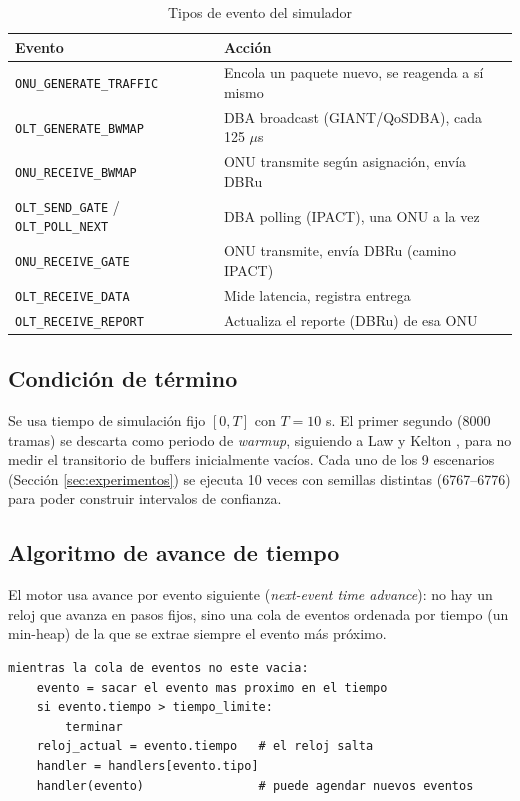 \documentclass[conference]{IEEEtran}
\begin{document}
\begin{table}[h]
\centering
\caption{Tipos de evento del simulador}
\label{tab:fel}
\begin{tabular}{p{3.5cm}p{3.7cm}}
\toprule
Evento & Acción \\
\midrule
\texttt{ONU\_GENERATE\_TRAFFIC} & Encola un paquete nuevo, se reagenda a sí mismo \\
\texttt{OLT\_GENERATE\_BWMAP} & DBA broadcast (GIANT/QoSDBA), cada 125 $\mu$s \\
\texttt{ONU\_RECEIVE\_BWMAP} & ONU transmite según asignación, envía DBRu \\
\texttt{OLT\_SEND\_GATE} / \texttt{OLT\_POLL\_NEXT} & DBA polling (IPACT), una ONU a la vez \\
\texttt{ONU\_RECEIVE\_GATE} & ONU transmite, envía DBRu (camino IPACT) \\
\texttt{OLT\_RECEIVE\_DATA} & Mide latencia, registra entrega \\
\texttt{OLT\_RECEIVE\_REPORT} & Actualiza el reporte (DBRu) de esa ONU \\
\bottomrule
\end{tabular}
\end{table}

\subsection{Condición de término}

Se usa tiempo de simulación fijo $[0, T]$ con $T=10$ s. El primer segundo
(8000 tramas) se descarta como periodo de \emph{warmup}, siguiendo a Law
y Kelton \cite{lawkelton}, para no medir el transitorio de buffers
inicialmente vacíos. Cada uno de los 9 escenarios (Sección
\ref{sec:experimentos}) se ejecuta 10 veces con semillas distintas
(6767--6776) para poder construir intervalos de confianza.

\subsection{Algoritmo de avance de tiempo}

El motor usa avance por evento siguiente (\emph{next-event time
advance}): no hay un reloj que avanza en pasos fijos, sino una cola de
eventos ordenada por tiempo (un min-heap) de la que se extrae siempre el
evento más próximo.

\begin{lstlisting}[style=pseudo]
mientras la cola de eventos no este vacia:
    evento = sacar el evento mas proximo en el tiempo
    si evento.tiempo > tiempo_limite:
        terminar
    reloj_actual = evento.tiempo   # el reloj salta
    handler = handlers[evento.tipo]
    handler(evento)                # puede agendar nuevos eventos
\end{lstlisting}
\end{document}
